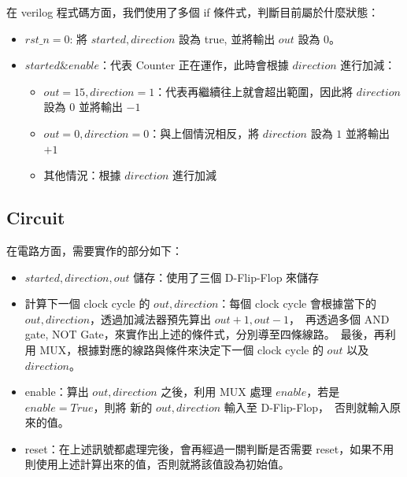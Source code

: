 \documentclass[10.5pt,compsoc,UTF8]{CjC}
\theoremstyle{mystyle}
\begin{document}
在 verilog 程式碼方面，我們使用了多個 if 條件式，判斷目前屬於什麼狀態：
\begin{itemize}
  \item $rst\_n = 0$: 將 $started, direction$ 設為 true, 並將輸出 $out$ 設為 $0$。
  \item $started \& enable$：代表 Counter 正在運作，此時會根據 $direction$ 進行加減：
  \begin{itemize}
    \item $out = 15, direction = 1$：代表再繼續往上就會超出範圍，因此將 $direction$ 設為 $0$ 並將輸出 $-1$
    \item $out = 0, direction = 0$：與上個情況相反，將 $direction$ 設為 $1$ 並將輸出 $+1$
    \item 其他情況：根據 $direction$ 進行加減
  \end{itemize}
\end{itemize}

\subsection{Circuit}

在電路方面，需要實作的部分如下：
\begin{itemize}
  \item $started, direction, out$ 儲存：使用了三個 D-Flip-Flop 來儲存
  \item 計算下一個 clock cycle 的 $out, direction$：每個 clock cycle 會根據當下的 $out, direction$，透過加減法器預先算出 $out + 1, out - 1$，\
  再透過多個 AND gate, NOT Gate，來實作出上述的條件式，分別導至四條線路。\
  最後，再利用 MUX，根據對應的線路與條件來決定下一個 clock cycle 的 $out$ 以及 $direction$。
  \item enable：算出 $out, direction$ 之後，利用 MUX 處理 $enable$，若是 $enable = True$，則將 新的 $out, direction$ 輸入至 D-Flip-Flop，\
  否則就輸入原來的值。
  \item reset：在上述訊號都處理完後，會再經過一關判斷是否需要 reset，如果不用則使用上述計算出來的值，否則就將該值設為初始值。
\end{itemize}

\newpage
\end{document}
